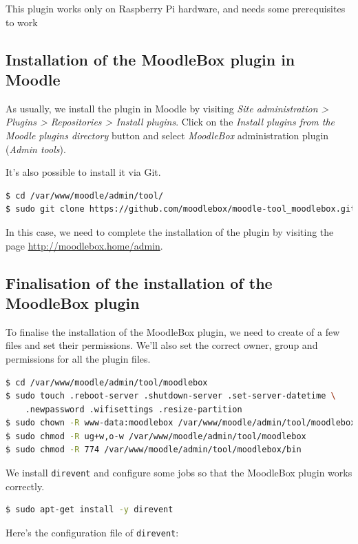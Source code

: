 \documentclass[12pt]{article}
\begin{document}
This plugin works only on Raspberry Pi hardware, and needs some prerequisites to work

\subsection{Installation of the MoodleBox plugin in Moodle}

As usually, we install the plugin in Moodle by visiting \emph{Site administration > Plugins > Repositories > Install plugins}.
Click on the \emph{Install plugins from the Moodle plugins directory} button and select \emph{MoodleBox} administration plugin (\emph{Admin tools}).

It's also possible to install it via Git.

\begin{lstlisting}[language=bash]
$ cd /var/www/moodle/admin/tool/
$ sudo git clone https://github.com/moodlebox/moodle-tool_moodlebox.git moodlebox
\end{lstlisting}

In this case, we need to complete the installation of the plugin by visiting the page \url{http://moodlebox.home/admin}.

\subsection{Finalisation of the installation of the MoodleBox plugin}

To finalise the installation of the MoodleBox plugin, we need to create of a few files and set their permissions.
We'll also set the correct owner, group and permissions for all the plugin files.
\begin{lstlisting}[language=bash]
$ cd /var/www/moodle/admin/tool/moodlebox
$ sudo touch .reboot-server .shutdown-server .set-server-datetime \ 
    .newpassword .wifisettings .resize-partition
$ sudo chown -R www-data:moodlebox /var/www/moodle/admin/tool/moodlebox
$ sudo chmod -R ug+w,o-w /var/www/moodle/admin/tool/moodlebox
$ sudo chmod -R 774 /var/www/moodle/admin/tool/moodlebox/bin
\end{lstlisting}

We install \lstinline{direvent} and configure some jobs so that the MoodleBox plugin works correctly.
\begin{lstlisting}[language=bash]
$ sudo apt-get install -y direvent
\end{lstlisting}
Here's the configuration file of \lstinline{direvent}:

\end{document}
